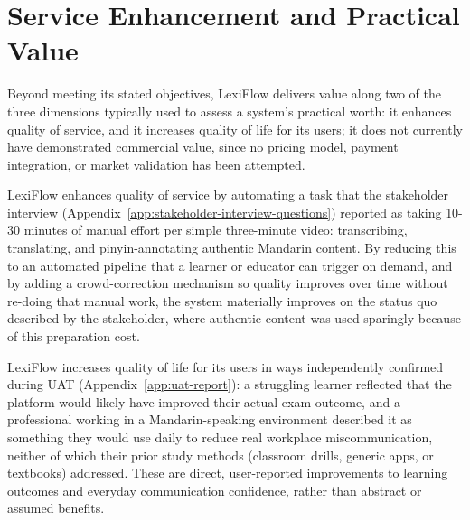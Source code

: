 \documentclass[oneside]{utmthesis}
\begin{document}
\section{Service Enhancement and Practical Value}
Beyond meeting its stated objectives, LexiFlow delivers value along two of the three dimensions typically used to assess a system's practical worth: it enhances quality of service, and it increases quality of life for its users; it does not currently have demonstrated commercial value, since no pricing model, payment integration, or market validation has been attempted.

LexiFlow enhances quality of service by automating a task that the stakeholder interview (Appendix~\ref{app:stakeholder-interview-questions}) reported as taking 10-30 minutes of manual effort per simple three-minute video: transcribing, translating, and pinyin-annotating authentic Mandarin content. By reducing this to an automated pipeline that a learner or educator can trigger on demand, and by adding a crowd-correction mechanism so quality improves over time without re-doing that manual work, the system materially improves on the status quo described by the stakeholder, where authentic content was used sparingly because of this preparation cost.

LexiFlow increases quality of life for its users in ways independently confirmed during UAT (Appendix~\ref{app:uat-report}): a struggling learner reflected that the platform would likely have improved their actual exam outcome, and a professional working in a Mandarin-speaking environment described it as something they would use daily to reduce real workplace miscommunication, neither of which their prior study methods (classroom drills, generic apps, or textbooks) addressed. These are direct, user-reported improvements to learning outcomes and everyday communication confidence, rather than abstract or assumed benefits.
\end{document}
